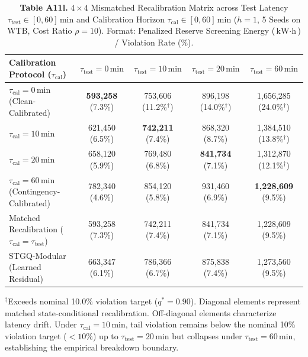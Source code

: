 \documentclass[
  journal]{IEEEtran}
\begin{document}
\begin{table}[!t]
\centering
\fontsize{8.0pt}{9.6pt}\selectfont
\setlength{\tabcolsep}{3.0pt}
\renewcommand{\arraystretch}{1.08}
\caption*{\textbf{Table A11l.} $4\times 4$ Mismatched Recalibration Matrix across Test Latency $\tau_{\mathrm{test}} \in [0, 60]\,\text{min}$ and Calibration Horizon $\tau_{\mathrm{cal}} \in [0, 60]\,\text{min}$ ($h=1$, 5 Seeds on WTB, Cost Ratio $\rho=10$). Format: Penalized Reserve Screening Energy ($\text{kW}\cdot\text{h}$) / Violation Rate (\%).}
%
\begin{tabular}{lcccc}
\toprule
Calibration Protocol ($\tau_{\mathrm{cal}}$) & $\tau_{\mathrm{test}} = 0\,\text{min}$ & $\tau_{\mathrm{test}} = 10\,\text{min}$ & $\tau_{\mathrm{test}} = 20\,\text{min}$ & $\tau_{\mathrm{test}} = 60\,\text{min}$ \\
\midrule
$\tau_{\mathrm{cal}} = 0\,\text{min}$ (Clean-Calibrated) & \textbf{593,258} (7.3\%) & 753,606 (11.2\%$^\dagger$) & 896,198 (14.0\%$^\dagger$) & 1,656,285 (24.0\%$^\dagger$) \\
$\tau_{\mathrm{cal}} = 10\,\text{min}$ & 621,450 (6.5\%) & \textbf{742,211} (7.4\%) & 868,320 (8.7\%) & 1,384,510 (13.8\%$^\dagger$) \\
$\tau_{\mathrm{cal}} = 20\,\text{min}$ & 658,120 (5.9\%) & 769,480 (6.8\%) & \textbf{841,734} (7.1\%) & 1,312,870 (12.1\%$^\dagger$) \\
$\tau_{\mathrm{cal}} = 60\,\text{min}$ (Contingency-Calibrated) & 782,340 (4.6\%) & 854,120 (5.8\%) & 931,460 (6.9\%) & \textbf{1,228,609} (9.5\%) \\
\midrule
Matched Recalibration ($\tau_{\mathrm{cal}} = \tau_{\mathrm{test}}$) & 593,258 (7.3\%) & 742,211 (7.4\%) & 841,734 (7.1\%) & 1,228,609 (9.5\%) \\
STGQ-Modular (Learned Residual) & 663,347 (6.1\%) & 786,366 (6.7\%) & 875,838 (7.4\%) & 1,273,560 (9.5\%) \\
\bottomrule
\end{tabular}
\vspace{1mm}
\fontsize{8.0pt}{9.6pt}\selectfont $^\dagger$Exceeds nominal 10.0\% violation target ($q^*=0.90$). Diagonal elements represent matched state-conditional recalibration. Off-diagonal elements characterize latency drift. Under $\tau_{\mathrm{cal}}=10\,\text{min}$, tail violation remains below the nominal 10\% violation target ($<10\%$) up to $\tau_{\mathrm{test}}=20\,\text{min}$ but collapses under $\tau_{\mathrm{test}}=60\,\text{min}$, establishing the empirical breakdown boundary.
\end{table}
\end{document}
